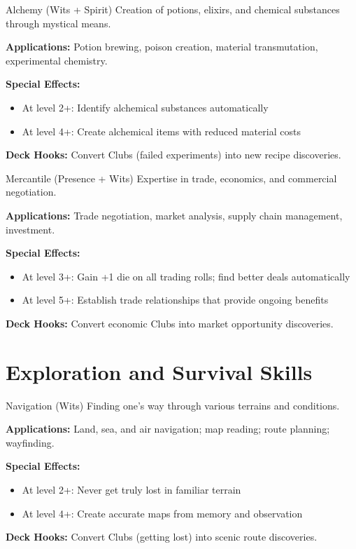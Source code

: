 \documentclass[11pt]{report}
\begin{document}
\begin{skillbox}{Alchemy (Wits + Spirit)}
Creation of potions, elixirs, and chemical substances through mystical means.

\textbf{Applications:} Potion brewing, poison creation, material transmutation, experimental chemistry.

\textbf{Special Effects:}
\begin{itemize}
    \item At level 2+: Identify alchemical substances automatically
    \item At level 4+: Create alchemical items with reduced material costs
\end{itemize}

\textbf{Deck Hooks:} Convert Clubs (failed experiments) into new recipe discoveries.
\end{skillbox}

\begin{skillbox}{Mercantile (Presence + Wits)}
Expertise in trade, economics, and commercial negotiation.

\textbf{Applications:} Trade negotiation, market analysis, supply chain management, investment.

\textbf{Special Effects:}
\begin{itemize}
    \item At level 3+: Gain +1 die on all trading rolls; find better deals automatically
    \item At level 5+: Establish trade relationships that provide ongoing benefits
\end{itemize}

\textbf{Deck Hooks:} Convert economic Clubs into market opportunity discoveries.
\end{skillbox}

\section{Exploration and Survival Skills}

\begin{skillbox}{Navigation (Wits)}
Finding one's way through various terrains and conditions.

\textbf{Applications:} Land, sea, and air navigation; map reading; route planning; wayfinding.

\textbf{Special Effects:}
\begin{itemize}
    \item At level 2+: Never get truly lost in familiar terrain
    \item At level 4+: Create accurate maps from memory and observation
\end{itemize}

\textbf{Deck Hooks:} Convert Clubs (getting lost) into scenic route discoveries.
\end{skillbox}
\end{document}
